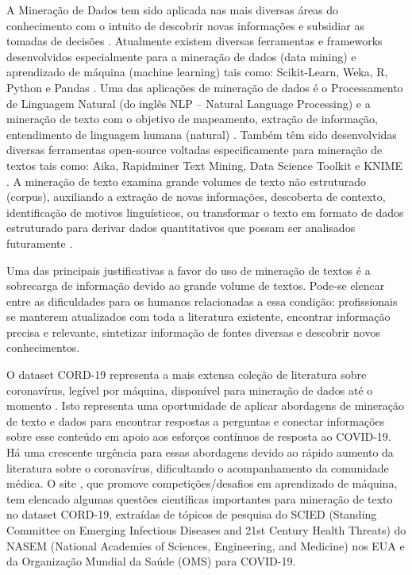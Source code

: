 \documentclass[
	12pt,				%
	a4paper,			%
	english,			%
	brazil,				%
	]{article}
\begin{document}
A Minera\c c\~ ao de Dados tem sido aplicada nas mais diversas \' areas do conhecimento com o intuito de descobrir novas informa\c c\~ oes e subsidiar as tomadas de decis\~ oes \cite{bramer2007principles, aggarwal2015data}. Atualmente existem diversas ferramentas e frameworks desenvolvidos especialmente para a minera\c c\~ ao de dados (data mining) e aprendizado de m\' aquina (machine learning) tais como: Scikit-Learn, Weka, R, Python e Pandas \cite{geron19}. Uma das aplica\c c\~ oes de minera\c c\~ ao de dados \' e o Processamento de Linguagem Natural (do ingl\^ es NLP – Natural Language Processing) e a minera\c c\~ ao de texto com o objetivo de mapeamento, extra\c c\~ ao de informa\c c\~ ao, entendimento de linguagem humana (natural) \cite{dinov2018data}. Tamb\' em t\^ em sido desenvolvidas diversas ferramentas open-source voltadas especificamente para minera\c c\~ ao de textos tais como: Aika, Rapidminer Text Mining, Data Science Toolkit e KNIME \cite{kaur2016comparison}. A minera\c c\~ ao de texto examina grande volumes de texto n\~ ao estruturado (corpus), auxiliando a extra\c c\~ ao de novas informa\c c\~ oes, descoberta de contexto, identifica\c c\~ ao de motivos lingu\' isticos, ou transformar o texto em formato de dados estruturado para derivar dados quantitativos que possam ser analisados futuramente \cite{aggarwal2015data}.

Uma das principais justificativas a favor do uso de minera\c c\~ ao de textos \' e a sobrecarga de informa\c c\~ ao devido ao grande volume de textos. Pode-se elencar entre as dificuldades para os humanos relacionadas a essa condi\c c\~ ao: profissionais se manterem atualizados com toda a literatura existente, encontrar informa\c c\~ ao precisa e relevante, sintetizar informa\c c\~ ao de fontes diversas e descobrir novos conhecimentos.

O dataset CORD-19 representa a mais extensa cole\c c\~ ao de literatura sobre coronav\' irus, leg\' ivel por m\' aquina, dispon\' ivel para minera\c c\~ ao de dados at\' e o momento \cite{kaggle20online}.
Isto representa uma oportunidade de aplicar abordagens de minera\c c\~ ao de texto e dados para encontrar respostas a perguntas e conectar informa\c c\~ oes sobre esse conte\' udo em apoio aos esfor\c cos cont\' inuos de resposta ao COVID-19.
H\' a uma crescente urg\^ encia para essas abordagens devido ao r\' apido aumento da literatura sobre o coronav\' irus, dificultando o acompanhamento da comunidade m\' edica.
O site , que promove competi\c c\~ oes/desafios em aprendizado de m\' aquina, tem elencado algumas quest\~ oes cient\' ificas importantes para minera\c c\~ ao de texto no dataset CORD-19, extra\' idas de t\' opicos de pesquisa do SCIED (Standing Committee on Emerging Infectious Diseases and 21st Century Health Threats) do NASEM (National Academies of Sciences, Engineering, and Medicine) nos EUA e da Organiza\c c\~ ao Mundial da Sa\' ude (OMS) para COVID-19.
\end{document}
